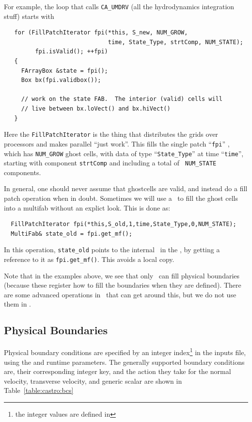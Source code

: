 \begin{itemize}
  For example, the loop that calls {\tt CA\_UMDRV} (all the
  hydrodynamics integration stuff) starts with
\begin{lstlisting}
   for (FillPatchIterator fpi(*this, S_new, NUM_GROW,
                              time, State_Type, strtComp, NUM_STATE);
         fpi.isValid(); ++fpi)
   {
     FArrayBox &state = fpi();
     Box bx(fpi.validbox());

     // work on the state FAB.  The interior (valid) cells will 
     // live between bx.loVect() and bx.hiVect()
   }
\end{lstlisting}
Here the {\tt FillPatchIterator} is the thing that distributes the
grids over processors and makes parallel ``just work''. This fills the
single patch ``{\tt fpi}'' , which has {\tt NUM\_GROW} ghost cells,
with data of type ``{\tt State\_Type}'' at time ``{\tt time}'',
starting with component {\tt strtComp} and including a total of {\tt
  NUM\_STATE} components. 

\end{itemize}

In general, one should never assume that ghostcells are valid, and
instead do a fill patch operation when in doubt.  Sometimes we will
use a \fillpatchiterator\ to fill the ghost cells into a multifab
without an explict look.  This is done as:
\begin{lstlisting}
  FillPatchIterator fpi(*this,S_old,1,time,State_Type,0,NUM_STATE);
  MultiFab& state_old = fpi.get_mf();     
\end{lstlisting}
In this operation, {\tt state\_old} points to the internal
\multifab\ in the \fillpatchiterator, by getting a reference to it as
              {\tt fpi.get\_mf()}.  This avoids a local copy.

Note that in the examples above, we see that only \statedata\ can fill
physical boundaries (because these register how to fill the boundaries
when they are defined).  There are some advanced operations in
\boxlib\ that can get around this, but we do not use them in \castro.  

\subsection{Physical Boundaries}

\label{soft:phys_bcs}

Physical boundary conditions are specified by an integer
index\footnote{the integer values are defined in } in
  the inputs file, using the  and
   runtime parameters.  The generally
  supported boundary conditions are, their corresponding integer key,
  and the action they take for the normal velocity, transverse
  velocity, and generic scalar are shown in Table~\ref{table:castro:bcs}


